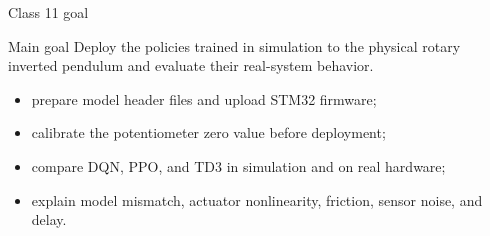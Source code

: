 \documentclass[aspectratio=169]{beamer}
\begin{document}
\begin{frame}{Class 11 goal}
\begin{block}{Main goal}
\small
Deploy the policies trained in simulation to the physical rotary inverted pendulum and evaluate their real-system behavior.
\end{block}

\vspace{0.25cm}


\begin{itemize}
    \item prepare model header files and upload STM32 firmware;
    \vspace{0.2cm}
    \item calibrate the potentiometer zero value before deployment;
    \vspace{0.2cm}
    \item compare DQN, PPO, and TD3 in simulation and on real hardware;
    \vspace{0.2cm}
    \item explain model mismatch, actuator nonlinearity, friction, sensor noise, and delay.
\end{itemize}
\end{frame}

\end{document}
